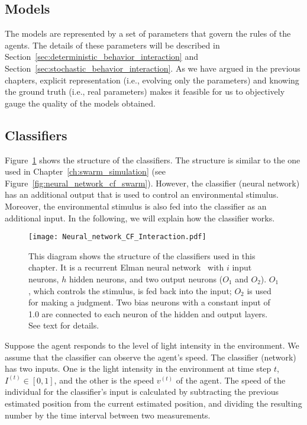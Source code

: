 \subsection{Models}\label{sec:model_deterministic_interaction} 

The models are represented by a set of parameters that govern the rules of the agents. The details of these parameters will be described in Section~\ref{sec:deterministic_behavior_interaction} and Section~\ref{sec:stochastic_behavior_interaction}. As we have argued in the previous chapters, explicit representation (i.e., evolving only the parameters) and knowing the ground truth (i.e., real parameters) makes it feasible for us to objectively gauge the quality of the models obtained. 

\subsection{Classifiers}

Figure~\ref{fig:neural_network_interaction} shows the structure of the classifiers. The structure is similar to the one used in Chapter~\ref{ch:swarm_simulation} (see Figure~\ref{fig:neural_network_cf_swarm}). However, the classifier (neural network) has an additional output that is used to control an environmental stimulus. Moreover, the environmental stimulus is also fed into the classifier as an additional input. In the following, we will explain how the classifier works.

\begin{figure}[!t]
    \centering
    \texttt{[image: Neural\_network\_CF\_Interaction.pdf]}
    \caption{This diagram shows the structure of the classifiers used in this chapter. It is a recurrent Elman neural network~\cite{Elman1990} with $i$ input neurons, $h$ hidden neurons, and two output neurons ($O_1$ and $O_2$). $O_1$, which controls the stimulus, is fed back into the input; $O_2$ is used for making a judgment. Two bias neurons with a constant input of 1.0 are connected to each neuron of the hidden and output layers. See text for details.}
    \label{fig:neural_network_interaction}
\end{figure}

Suppose the agent responds to the level of light intensity in the environment. We assume that the classifier can observe the agent's speed. The classifier (network) has two inputs. One is the light intensity in the environment at time step $t$, $I^{\left(t\right)}\in [0,1]$, and the other is the speed $v^{\left(t\right)}$ of the agent. The speed of the individual for the classifier's input is calculated by subtracting the previous estimated position from the current estimated position, and dividing the resulting number by the time interval between two measurements.

